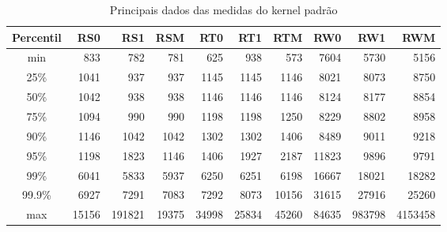 \begin{table}[!htb]
\centering
\begin{center}
\begin{tabular}{|c||r|r|r|r|r|r|r|r|r|}
\toprule
Percentil &    RS0 &     RS1 &    RSM &    RT0 &    RT1 &    RTM &    RW0 &     RW1 &      RWM \\
\midrule
    min &    833 &     782 &    781 &    625 &    938 &    573 &   7604 &    5730 &     5156 \\
    25\% &   1041 &     937 &    937 &   1145 &   1145 &   1146 &   8021 &    8073 &     8750 \\
    50\% &   1042 &     938 &    938 &   1146 &   1146 &   1146 &   8124 &    8177 &     8854 \\
    75\% &   1094 &     990 &    990 &   1198 &   1198 &   1250 &   8229 &    8802 &     8958 \\
    90\% &   1146 &    1042 &   1042 &   1302 &   1302 &   1406 &   8489 &    9011 &     9218 \\
    95\% &   1198 &    1823 &   1146 &   1406 &   1927 &   2187 &  11823 &    9896 &     9791 \\
    99\% &   6041 &    5833 &   5937 &   6250 &   6251 &   6198 &  16667 &   18021 &    18282 \\
    99.9\% &   6927 &    7291 &   7083 &   7292 &   8073 &  10156 &  31615 &   27916 &    25260 \\
    max &  15156 &  191821 &  19375 &  34998 &  25834 &  45260 &  84635 &  983798 &  4153458 \\
\bottomrule
\end{tabular}
\end{center}
\caption{Principais dados das medidas do kernel padrão}
\label{table:rpi}
\end{table}

